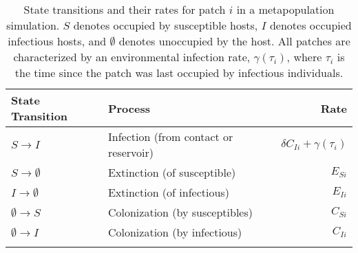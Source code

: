 \documentclass{article}
\begin{document}
\begin{table}
\caption{State transitions and their rates for patch $i$ in a metapopulation simulation.  $S$ denotes occupied by  susceptible hosts, $I$ denotes occupied infectious hosts, and $\emptyset$ denotes unoccupied by the host.  All patches are characterized by an environmental infection rate, $\gamma(\tau_i)$, where $\tau_i$ is the time since the patch was last occupied by infectious individuals.}
\begin{tabular}{llr}
State Transition & Process &  Rate \\
\hline
$S \rightarrow I$ & Infection (from contact or reservoir) & $\delta C_{Ii} + \gamma(\tau_i)$\\
$S \rightarrow \emptyset $ & Extinction (of susceptible) & $E_{Si}$\\
$I \rightarrow \emptyset $ & Extinction (of infectious) &  $E_{Ii}$ \\
$\emptyset \rightarrow S$ & Colonization (by susceptibles) & $C_{Si}$\\
$\emptyset \rightarrow I$ & Colonization (by infectious) & $C_{Ii}$\\
\label{transitions}
\end{tabular}
\end{table}

\end{document}

